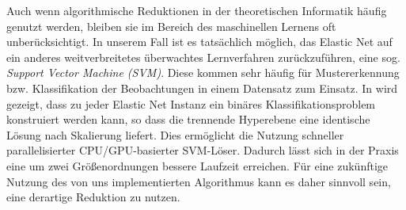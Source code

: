 Auch wenn algorithmische Reduktionen in der theoretischen Informatik häufig genutzt werden, bleiben sie im Bereich des maschinellen Lernens oft unberücksichtigt. In unserem Fall ist es tatsächlich möglich, das Elastic Net auf ein anderes weitverbreitetes überwachtes Lernverfahren zurückzuführen, eine sog. \textit{Support Vector Machine (SVM)}. Diese kommen sehr häufig für Mustererkennung bzw. Klassifikation der Beobachtungen in einem Datensatz zum Einsatz. In \cite{zhou} wird gezeigt, dass zu jeder Elastic Net Instanz ein binäres Klassifikationsproblem konstruiert werden kann, so dass die trennende Hyperebene eine identische Lösung nach Skalierung liefert. Dies ermöglicht die Nutzung schneller parallelisierter CPU/GPU-basierter SVM-Löser. Dadurch lässt sich in der Praxis eine um zwei Größenordnungen bessere Laufzeit erreichen. Für eine zukünftige Nutzung des von uns implementierten Algorithmus kann es daher sinnvoll sein, eine derartige Reduktion zu nutzen.
